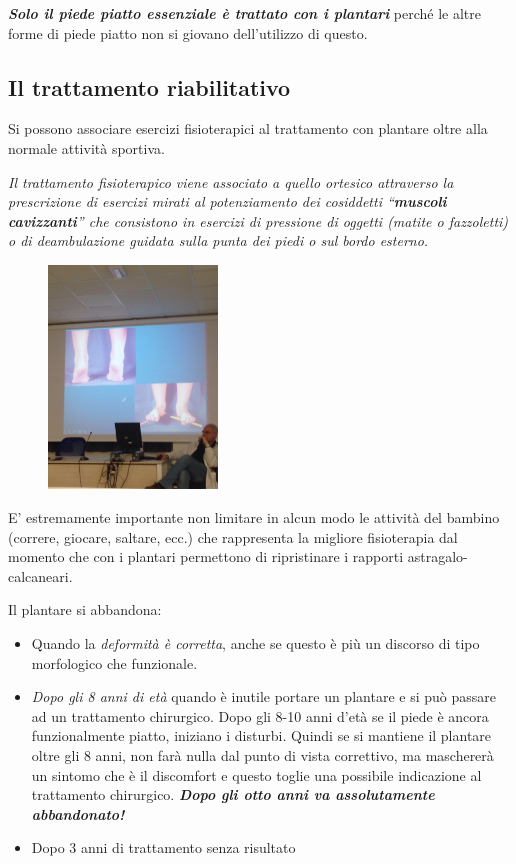 \textbf{\emph{Solo il piede piatto essenziale è trattato con i plantari}} perché le altre forme di piede piatto non si giovano dell'utilizzo di questo.

\subsection{Il trattamento riabilitativo}

Si possono associare esercizi fisioterapici al trattamento con plantare oltre alla normale attività sportiva.

\emph{Il trattamento fisioterapico viene associato a quello ortesico attraverso la prescrizione di esercizi mirati al potenziamento dei cosiddetti ``\textbf{muscoli cavizzanti}'' che consistono in esercizi di pressione di oggetti (matite o fazzoletti) o di deambulazione guidata
sulla punta dei piedi o sul bordo esterno.}

\begin{figure}[!ht]
\centering
\includegraphics[width=0.4\textwidth]{015/image5.jpeg}
\end{figure}


E' estremamente importante non limitare in alcun modo le attività del bambino (correre, giocare, saltare, ecc.) che rappresenta la migliore fisioterapia dal momento che con i plantari permettono di ripristinare i rapporti astragalo-calcaneari.

Il plantare si abbandona:

\begin{itemize}
\item
  Quando la \emph{deformità è corretta}, anche se questo è più un discorso di tipo morfologico che funzionale.
\item
  \emph{Dopo gli 8 anni di età} quando è inutile portare un plantare e si può passare ad un trattamento chirurgico. Dopo gli 8-10 anni d'età se il piede è ancora funzionalmente piatto, iniziano i disturbi. Quindi se si mantiene il plantare oltre gli 8 anni, non farà nulla dal punto di vista correttivo, ma maschererà un sintomo che è il discomfort e questo toglie una possibile indicazione al trattamento chirurgico. \textbf{\emph{Dopo gli otto anni va assolutamente abbandonato!}}
\item
  Dopo 3 anni di trattamento senza risultato
\end{itemize}

